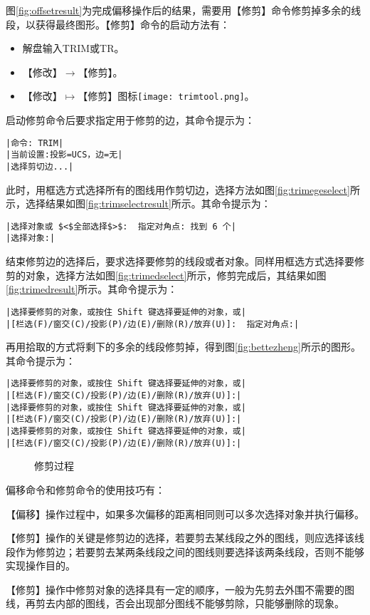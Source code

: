 \begin{procedure}
图\ref{fig:offsetresult}为完成偏移操作后的结果，需要用【修剪】命令修剪掉多余的线段，以获得最终图形。【修剪】命令的启动方法有：
\begin{itemize}
\item 解盘输入TRIM或TR。
\item 【修改】$\rightarrow$【修剪】。
\item 【修改】$\mapsto$【修剪】图标\texttt{[image: trimtool.png]}。
\end{itemize}
启动修剪命令后要求指定用于修剪的边，其命令提示为：
\begin{lstlisting}
|命令: TRIM|
|当前设置:投影=UCS，边=无|
|选择剪切边...|
\end{lstlisting}
此时，用框选方式选择所有的图线用作剪切边，选择方法如图\ref{fig:trimegeselect}所示，选择结果如图\ref{fig:trimselectresult}所示。其命令提示为：
\begin{lstlisting}
|选择对象或 $<$全部选择$>$:  指定对角点: 找到 6 个|
|选择对象:|
\end{lstlisting}
结束修剪边的选择后，要求选择要修剪的线段或者对象。同样用框选方式选择要修剪的对象，选择方法如图\ref{fig:trimedselect}所示，修剪完成后，其结果如图\ref{fig:trimedresult}所示。其命令提示为：
\begin{lstlisting}
|选择要修剪的对象，或按住 Shift 键选择要延伸的对象，或|
|[栏选(F)/窗交(C)/投影(P)/边(E)/删除(R)/放弃(U)]:  指定对角点:|
\end{lstlisting}
再用拾取的方式将剩下的多余的线段修剪掉，得到图\ref{fig:bettezheng}所示的图形。其命令提示为：
\begin{lstlisting}
|选择要修剪的对象，或按住 Shift 键选择要延伸的对象，或|
|[栏选(F)/窗交(C)/投影(P)/边(E)/删除(R)/放弃(U)]:|
|选择要修剪的对象，或按住 Shift 键选择要延伸的对象，或|
|[栏选(F)/窗交(C)/投影(P)/边(E)/删除(R)/放弃(U)]:|
|选择要修剪的对象，或按住 Shift 键选择要延伸的对象，或|
|[栏选(F)/窗交(C)/投影(P)/边(E)/删除(R)/放弃(U)]:|
\end{lstlisting}
\begin{figure}[htbp]
\hspace{20pt}
\hspace{20pt}
\hspace{20pt}
\caption{修剪过程}
\end{figure}
\end{procedure}

偏移命令和修剪命令的使用技巧有：
\begin{tips}
\item 【偏移】操作过程中，如果多次偏移的距离相同则可以多次选择对象并执行偏移。
\item 【修剪】操作的关键是修剪边的选择，若要剪去某线段之外的图线，则应选择该线段作为修剪边；若要剪去某两条线段之间的图线则要选择该两条线段，否则不能够实现操作目的。
\item 【修剪】操作中修剪对象的选择具有一定的顺序，一般为先剪去外围不需要的图线，再剪去内部的图线，否会出现部分图线不能够剪除，只能够删除的现象。
\end{tips}

\endinput
